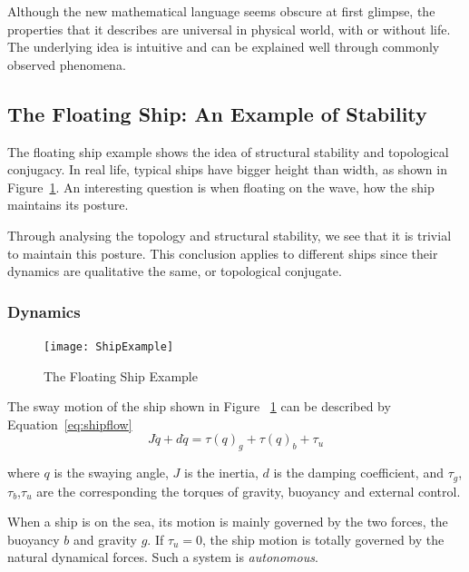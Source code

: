 Although the new mathematical language seems obscure at first glimpse, the properties that it describes are universal in physical world, with or without life.
The underlying idea is intuitive and can be explained well through commonly observed phenomena.



\subsection{The Floating Ship: An Example of Stability}
The floating ship  example shows the idea of structural stability and topological conjugacy.
In real life, typical ships have bigger height than width, as shown in Figure~\ref{fig:ShipFloating}.
An interesting  question is when floating on the wave, how the ship maintains its posture.

Through analysing the topology and structural stability, we see that it is trivial to maintain this posture.
This conclusion applies to different ships since their dynamics are qualitative the same, or topological conjugate.


\subsubsection*{Dynamics}

\begin{figure}[!htbp]
  \begin{center}
    \texttt{[image: ShipExample]}
    \caption{The Floating Ship Example}
    \label{fig:ShipFloating}
  \end{center}
\end{figure}

The sway motion of the ship shown in Figure ~\ref{fig:ShipFloating} can be described by Equation~\ref{eq:shipflow}
\begin{equation}
\label{eq:shipflow}
J\ddot{q}+d\dot{q}=\tau(q)_{g}+\tau(q)_{b}+\tau_{u}
\end{equation}


where $q$ is the swaying angle,
$J$ is the inertia,  
$d$ is the damping coefficient,
and $\tau_{g}$,$\tau_{b}$,$\tau_{u}$ are the corresponding the torques of gravity, buoyancy and external control.

When a ship is on the sea, its motion is mainly governed by the two forces, the buoyancy $b$ and gravity $g$.
If $\tau_{u}=0$,  the ship motion is totally governed by the natural dynamical forces.
Such a system is \emph{autonomous}.

